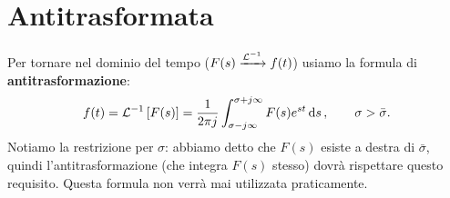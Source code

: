 \section{Antitrasformata}
\begin{defin}{}{}
Per tornare nel dominio del tempo ($F(s) \xrightarrow{\mathcal{L}^{-1}} f(t)$) usiamo la formula di \textbf{antitrasformazione}:
\begin{equation}
	f(t) = \mathcal{L}^{-1}\left[ F(s) \right] = \frac{1}{2\pi j}\int_{\sigma-j\infty}^{\sigma + j\infty} F(s) e^{st} \dd{s}, \quad \quad \sigma > \bar \sigma.
\end{equation}
Notiamo la restrizione per $\sigma$: abbiamo detto che $F(s)$ esiste a destra di $\bar \sigma$, quindi l'antitrasformazione (che integra $F(s)$ stesso) dovrà rispettare questo requisito. Questa formula non verrà mai utilizzata praticamente.
\end{defin}


